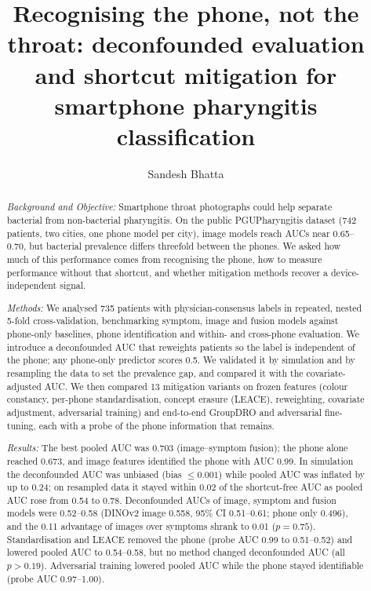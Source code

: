 \documentclass[preprint,12pt]{elsarticle}
\begin{document}
\begin{frontmatter}

\title{Recognising the phone, not the throat: deconfounded evaluation and shortcut mitigation for smartphone pharyngitis classification}

\author[a]{Sandesh Bhatta}


\begin{abstract}
\textit{Background and Objective:} Smartphone throat photographs could help separate bacterial from non-bacterial pharyngitis. On the public PGUPharyngitis dataset (742 patients, two cities, one phone model per city), image models reach AUCs near 0.65--0.70, but bacterial prevalence differs threefold between the phones. We asked how much of this performance comes from recognising the phone, how to measure performance without that shortcut, and whether mitigation methods recover a device-independent signal.

\textit{Methods:} We analysed 735 patients with physician-consensus labels in repeated, nested 5-fold cross-validation, benchmarking symptom, image and fusion models against phone-only baselines, phone identification and within- and cross-phone evaluation. We introduce a deconfounded AUC that reweights patients so the label is independent of the phone; any phone-only predictor scores 0.5. We validated it by simulation and by resampling the data to set the prevalence gap, and compared it with the covariate-adjusted AUC. We then compared 13 mitigation variants on frozen features (colour constancy, per-phone standardisation, concept erasure (LEACE), reweighting, covariate adjustment, adversarial training) and end-to-end GroupDRO and adversarial fine-tuning, each with a probe of the phone information that remains.

\textit{Results:} The best pooled AUC was 0.703 (image--symptom fusion); the phone alone reached 0.673, and image features identified the phone with AUC 0.99. In simulation the deconfounded AUC was unbiased (bias $\leq 0.001$) while pooled AUC was inflated by up to 0.24; on resampled data it stayed within 0.02 of the shortcut-free AUC as pooled AUC rose from 0.54 to 0.78. Deconfounded AUCs of image, symptom and fusion models were 0.52--0.58 (DINOv2 image 0.558, 95\% CI 0.51--0.61; phone only 0.496), and the 0.11 advantage of images over symptoms shrank to 0.01 ($p = 0.75$). Standardisation and LEACE removed the phone (probe AUC 0.99 to 0.51--0.52) and lowered pooled AUC to 0.54--0.58, but no method changed deconfounded AUC (all $p > 0.19$). Adversarial training lowered pooled AUC while the phone stayed identifiable (probe AUC 0.97--1.00).


\end{abstract}
\end{frontmatter}
\end{document}

